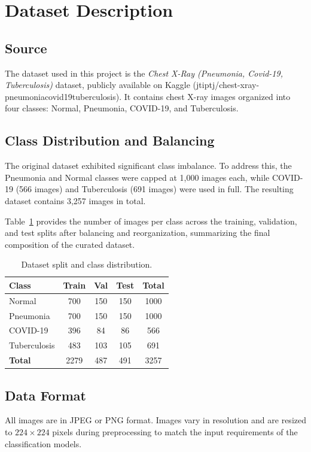 \documentclass[12pt]{report}
\begin{document}
\section{Dataset Description}

\subsection{Source}
The dataset used in this project is the \textit{Chest X-Ray (Pneumonia,
Covid-19, Tuberculosis)} dataset, publicly available on Kaggle
(jtiptj/chest-xray-pneumoniacovid19tuberculosis). It contains chest
X-ray images organized into four classes: Normal, Pneumonia, COVID-19,
and Tuberculosis.

\subsection{Class Distribution and Balancing}
The original dataset exhibited significant class imbalance. To address
this, the Pneumonia and Normal classes were capped at 1,000 images each,
while COVID-19 (566 images) and Tuberculosis (691 images) were used in
full. The resulting dataset contains 3,257 images in total.

Table~\ref{tab:dataset} provides the number of images per class across the training, validation, and test splits after balancing and reorganization, summarizing the final composition of the curated dataset.

\begin{table}[h]
\centering
\caption{Dataset split and class distribution.}
\label{tab:dataset}
\begin{tabular}{lcccc}
\hline
\textbf{Class} & \textbf{Train} & \textbf{Val} & \textbf{Test} &
\textbf{Total} \\
\hline
Normal         & 700  & 150 & 150 & 1000 \\
Pneumonia      & 700  & 150 & 150 & 1000 \\
COVID-19       & 396  & 84  & 86  & 566  \\
Tuberculosis   & 483  & 103 & 105 & 691  \\
\hline
\textbf{Total} & 2279 & 487 & 491 & 3257 \\
\hline
\end{tabular}
\end{table}

\subsection{Data Format}
All images are in JPEG or PNG format. Images vary in resolution and are
resized to $224 \times 224$ pixels during preprocessing to match the
input requirements of the classification models.
\end{document}
